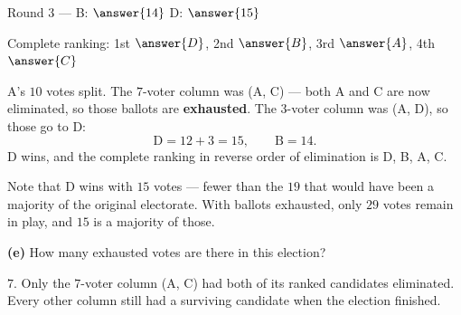 \documentclass[12pt]{ximera}
\begin{document}
\begin{problem}
\begin{prompt}
Round 3 --- B: $\answer{14}$ \quad D: $\answer{15}$

\smallskip
Complete ranking: 1st $\answer{D}$, 2nd $\answer{B}$, 3rd $\answer{A}$, 4th $\answer{C}$

\begin{feedback}
A's $10$ votes split. The $7$-voter column was (A, C) --- both A and C are now
eliminated, so those ballots are \textbf{exhausted}. The $3$-voter column was (A, D),
so those go to D:
\[ \text{D} = 12+3 = 15, \qquad \text{B} = 14. \]
D wins, and the complete ranking in reverse order of elimination is D, B, A, C.

Note that D wins with $15$ votes --- fewer than the $19$ that would have been a
majority of the original electorate. With ballots exhausted, only $29$ votes remain in
play, and $15$ is a majority of those.
\end{feedback}
\end{prompt}

\begin{prompt}
\textbf{(e)} How many exhausted votes are there in this election?

\begin{multipleChoice}
\end{multipleChoice}

\begin{feedback}
$7$. Only the $7$-voter column (A, C) had both of its ranked candidates eliminated.
Every other column still had a surviving candidate when the election finished.
\end{feedback}
\end{prompt}
\end{problem}
\end{document}
